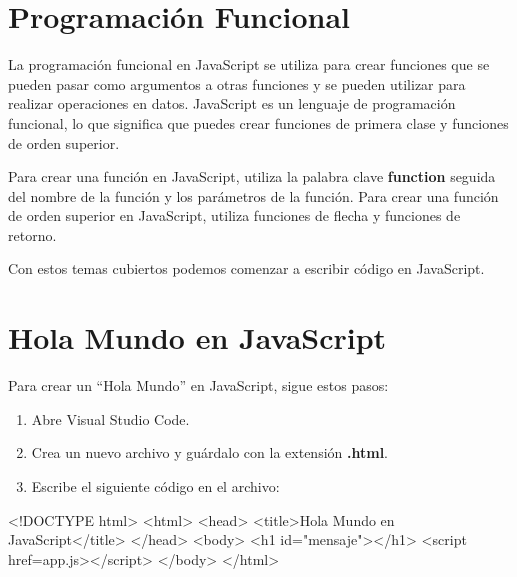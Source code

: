 \documentclass[
  a4paper,
  DIV=11,
  numbers=noendperiod,
  onepage,
  openany]{scrreprt}
\newenvironment{Shaded}{\begin{snugshade}}{\end{snugshade}}
\newcommand{\DataTypeTok}[1]{\textcolor[rgb]{0.68,0.00,0.00}{#1}}
\newcommand{\KeywordTok}[1]{\textcolor[rgb]{0.00,0.23,0.31}{#1}}
\newcommand{\NormalTok}[1]{\textcolor[rgb]{0.00,0.23,0.31}{#1}}
\newcommand{\OperatorTok}[1]{\textcolor[rgb]{0.37,0.37,0.37}{#1}}
\newcommand{\OtherTok}[1]{\textcolor[rgb]{0.00,0.23,0.31}{#1}}
\newcommand{\StringTok}[1]{\textcolor[rgb]{0.13,0.47,0.30}{#1}}
\begin{document}
\section{Programación Funcional}\label{programaciuxf3n-funcional}

La programación funcional en JavaScript se utiliza para crear funciones
que se pueden pasar como argumentos a otras funciones y se pueden
utilizar para realizar operaciones en datos. JavaScript es un lenguaje
de programación funcional, lo que significa que puedes crear funciones
de primera clase y funciones de orden superior.

Para crear una función en JavaScript, utiliza la palabra clave
\textbf{function} seguida del nombre de la función y los parámetros de
la función. Para crear una función de orden superior en JavaScript,
utiliza funciones de flecha y funciones de retorno.

Con estos temas cubiertos podemos comenzar a escribir código en
JavaScript.

\section{Hola Mundo en JavaScript}\label{hola-mundo-en-javascript}

Para crear un ``Hola Mundo'' en JavaScript, sigue estos pasos:

\begin{enumerate}
\def\labelenumi{\arabic{enumi}.}
\item
  Abre Visual Studio Code.
\item
  Crea un nuevo archivo y guárdalo con la extensión \textbf{.html}.
\item
  Escribe el siguiente código en el archivo:
\end{enumerate}

\begin{Shaded}
\begin{Highlighting}[]
\DataTypeTok{\textless{}!DOCTYPE }\NormalTok{html}\DataTypeTok{\textgreater{}}
\DataTypeTok{\textless{}}\KeywordTok{html}\DataTypeTok{\textgreater{}}
\DataTypeTok{\textless{}}\KeywordTok{head}\DataTypeTok{\textgreater{}}
    \DataTypeTok{\textless{}}\KeywordTok{title}\DataTypeTok{\textgreater{}}\NormalTok{Hola Mundo en JavaScript}\DataTypeTok{\textless{}/}\KeywordTok{title}\DataTypeTok{\textgreater{}}
\DataTypeTok{\textless{}/}\KeywordTok{head}\DataTypeTok{\textgreater{}}
\DataTypeTok{\textless{}}\KeywordTok{body}\DataTypeTok{\textgreater{}}
    \DataTypeTok{\textless{}}\KeywordTok{h1}\OtherTok{ id}\OperatorTok{=}\StringTok{"mensaje"}\DataTypeTok{\textgreater{}\textless{}/}\KeywordTok{h1}\DataTypeTok{\textgreater{}}
    \DataTypeTok{\textless{}}\KeywordTok{script}\OtherTok{ href}\OperatorTok{=}\StringTok{\textquotesingle{}app.js\textquotesingle{}}\DataTypeTok{\textgreater{}\textless{}/}\KeywordTok{script}\DataTypeTok{\textgreater{}}
\DataTypeTok{\textless{}/}\KeywordTok{body}\DataTypeTok{\textgreater{}}
\DataTypeTok{\textless{}/}\KeywordTok{html}\DataTypeTok{\textgreater{}}
\end{Highlighting}
\end{Shaded}
\end{document}
